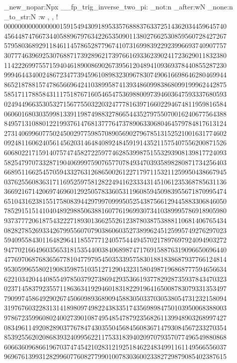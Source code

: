 \cs_new_nopar:Npx \__fp_trig_inverse_two_pi:
  {
    \exp_not:n { \exp_after:wN \use_none:n \token_to_str:N }
    \cs:w , , !
    0000000000000000159154943091895335768883763372514362034459645740 ~
    4564487476673440588967976342265350901138027662530859560728427267 ~
    5795803689291184611457865287796741073169983922923996693740907757 ~
    3077746396925307688717392896217397661693362390241723629011832380 ~
    1142226997557159404618900869026739561204894109369378440855287230 ~
    9994644340024867234773945961089832309678307490616698646280469944 ~
    8652187881574786566964241038995874139348609983868099199962442875 ~
    5851711788584311175187671605465475369880097394603647593337680593 ~
    0249449663530532715677550322032477781639716602294674811959816584 ~
    0606016803035998133911987498832786654435279755070016240677564388 ~
    8495713108801221993761476813777647378906330680464579784817613124 ~
    2731406996077502450029775985708905690279678513152521001631774602 ~
    0924811606240561456203146484089248459191435211575407556200871526 ~
    6068022171591407574745827225977462853998751553293908139817724093 ~
    5825479707332871904069997590765770784934703935898280871734256403 ~
    6689511662545705943327631268650026122717971153211259950438667945 ~
    0376255608363171169525975812822494162333431451061235368785631136 ~
    3669216714206974696012925057833605311960859450983955671870995474 ~
    6510431623815517580839442979970999505254387566129445883306846050 ~
    7852915151410404892988506388160776196993073410389995786918905980 ~
    9373777206187543222718930136625526123878038753888110681406765434 ~
    0828278526933426799556070790386060352738996245125995749276297023 ~
    5940955843011648296411855777124057544494570217897697924094903272 ~
    9477021664960356531815354400384068987471769158876319096650696440 ~
    4776970687683656778104779795450353395758301881838687937766124814 ~
    9530599655802190835987510351271290432315804987196868777594656634 ~
    6221034204440855497850379273869429353661937782928735937843470323 ~
    0237145837923557118636341929460183182291964165008783079331353497 ~
    7909974586492902674506098936890945883050337030538054731232158094 ~
    3197676032283131418980974982243833517435698984750103950068388003 ~
    9786723599608024002739010874954854787923568261139948903268997427 ~
    0834961149208289037767847430355045684560836714793084567233270354 ~
    8539255620208683932409956221175331839402097079357077496549880868 ~
    6066360968661967037474542102831219251846224834991161149566556037 ~
    9696761399312829960776082779901007830360023382729879085402387615 ~
}
